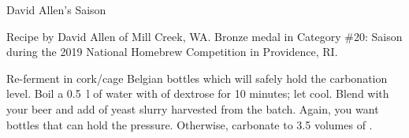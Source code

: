 \begin{recipe}{David Allen's Saison}

\begin{aboutblock}
Recipe by David Allen of Mill Creek, WA. Bronze medal in Category \#20: Saison
during the 2019 National Homebrew Competition in Providence, RI. \sourceaha
\end{aboutblock}


\begin{methodandtiming}
 
\begin{mashsteps}
\end{mashsteps}

\begin{fermentationsteps}
\end{fermentationsteps}

\begin{directions}
Re-ferment in cork/cage Belgian bottles which will safely hold the carbonation level.
Boil a 0.5~l of water with  of dextrose for 10 minutes; let cool. Blend with
your beer and add  of yeast slurry harvested from the batch.
Again, you want bottles that can hold the pressure. Otherwise, carbonate to 3.5 volumes
of .
\end{directions}

\end{methodandtiming}

\recipebreak

\begin{ingredientsblock}

\begin{malts}
\end{malts}

\begin{hops}
\end{hops}

\begin{yeastsx}
\end{yeastsx}

\end{ingredientsblock}

\end{recipe}

